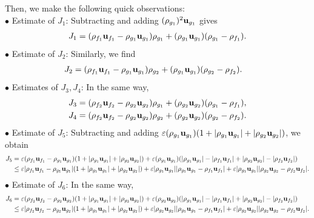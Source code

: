 \documentclass[10pt,reqno]{amsart}
\numberwithin{equation}{section}
\newcommand{\ve}{\varepsilon}
\begin{document}
Then, we make the following quick observations:\\
$\bullet$ Estimate of $J_1$: Subtracting and adding $ (\rho_{g_1})^2 {\bf{u}}_{g_1}$ gives
\begin{align*}
    J_1 = (\rho_{f_1}{\bf{u}}_{f_1} - \rho_{g_1}{\bf{u}}_{g_1})\rho_{g_1} + (\rho_{g_1}{\bf{u}}_{g_1}) (\rho_{g_1} - \rho_{f_1}).
\end{align*}
$\bullet$ Estimate of $J_2$: Similarly, we find
\begin{align*}
    J_2 &= (\rho_{f_1} {\bf{u}}_{f_1} - \rho_{g_1} {\bf{u}}_{g_1}) \rho_{g_2} +  (\rho_{g_1} {\bf{u}}_{g_1})(\rho_{g_2} - \rho_{f_2})  .
\end{align*}
$\bullet$ Estimates of $J_3,J_4$: In the same way,
\begin{align*}
    &J_3 =(\rho_{f_2} {\bf{u}}_{f_2} - \rho_{g_2} {\bf{u}}_{g_2}) \rho_{g_1} +  (\rho_{g_2} {\bf{u}}_{g_2}) (\rho_{g_1} - \rho_{f_1}),\\
    &J_4 = (\rho_{f_2} {\bf{u}}_{f_2} - \rho_{g_2} {\bf{u}}_{g_2}) \rho_{g_2} + (\rho_{g_2} {\bf{u}}_{g_2})(\rho_{g_2} - \rho_{f_2}).
\end{align*}
$\bullet$ Estimate of $J_5$: Subtracting and adding $\ve  (\rho_{g_1}{\bf{u}}_{g_1})(1+|\rho_{g_1}{\bf{u}}_{g_1}| + |\rho_{g_2}{\bf{u}}_{g_2}|)$, we obtain
\begin{align*}
    J_5 &= \ve (\rho_{f_1}{\bf{u}}_{f_1} - \rho_{g_1}{\bf{u}}_{g_1}) (1+|\rho_{g_1}{\bf{u}}_{g_1}|+|\rho_{g_2}{\bf{u}}_{g_2}|)  + \ve  (\rho_{g_1}{\bf{u}}_{g_1}) (|\rho_{g_1}{\bf{u}}_{g_1}| - |\rho_{f_1}{\bf{u}}_{f_1}| + |\rho_{g_2}{\bf{u}}_{g_2}| - |\rho_{f_2}{\bf{u}}_{f_2}|) \\
    &\le \ve  |\rho_{f_1} {\bf{u}}_{f_1} - \rho_{g_1}{\bf{u}}_{g_1}| (1+|\rho_{g_1}{\bf{u}}_{g_1}|+|\rho_{g_2}{\bf{u}}_{g_2}|)  + \ve  |\rho_{g_1} {\bf{u}}_{g_1}| |\rho_{g_1}{\bf{u}}_{g_1} - \rho_{f_1}{\bf{u}}_{f_1}| + \ve  |\rho_{g_1} {\bf{u}}_{g_1}| |\rho_{g_2}{\bf{u}}_{g_2} - \rho_{f_2}{\bf{u}}_{f_2}| .
\end{align*}
$\bullet$ Estimate of $J_6$: In the same way,
\begin{align*}
    J_6 &= \ve   (\rho_{f_2}{\bf{u}}_{f_2} - \rho_{g_2}{\bf{u}}_{g_2}) (1+|\rho_{g_1}{\bf{u}}_{g_1}| + |\rho_{g_2} {\bf{u}}_{g_2}|)   + \ve  (\rho_{g_2} {\bf{u}}_{g_2}) (|\rho_{g_1}{\bf{u}}_{g_1}| - |\rho_{f_1}{\bf{u}}_{f_1}| + |\rho_{g_2}{\bf{u}}_{g_2}| - |\rho_{f_2} {\bf{u}}_{f_2}|) \\
    &\le \ve  |\rho_{f_2}{\bf{u}}_{f_2} - \rho_{g_2}{\bf{u}}_{g_2}| (1 + |\rho_{g_1}{\bf{u}}_{g_1}| + |\rho_{g_2}{\bf{u}}_{g_2}|)  + \ve  |\rho_{g_2} {\bf{u}}_{g_2}| |\rho_{g_1}{\bf{u}}_{g_1} - \rho_{f_1}{\bf{u}}_{f_1}| + \ve  |\rho_{g_2}{\bf{u}}_{g_2}| |\rho_{g_2}{\bf{u}}_{g_2} - \rho_{f_2}{\bf{u}}_{f_2}|.
\end{align*}
\end{document}
